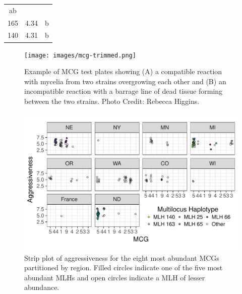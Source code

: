 \begin{longtable}[]{@{}cll@{}}
\begin{minipage}[t]{0.08\columnwidth}
ab\strut
\end{minipage}\tabularnewline
\begin{minipage}[t]{0.10\columnwidth}\centering\strut
165\strut
\end{minipage} & \begin{minipage}[t]{0.25\columnwidth}\raggedright\strut
4.34\strut
\end{minipage} & \begin{minipage}[t]{0.08\columnwidth}\raggedright\strut
b\strut
\end{minipage}\tabularnewline
\begin{minipage}[t]{0.10\columnwidth}\centering\strut
140\strut
\end{minipage} & \begin{minipage}[t]{0.25\columnwidth}\raggedright\strut
4.31\strut
\end{minipage} & \begin{minipage}[t]{0.08\columnwidth}\raggedright\strut
b\strut
\end{minipage}\tabularnewline
\bottomrule
\end{longtable}

\begin{figure}
\centering
\texttt{[image: images/mcg-trimmed.png]}
\caption{Example of MCG test plates showing (A) a compatible reaction
with mycelia from two strains overgrowing each other and (B) an
incompatible reaction with a barrage line of dead tissue forming between
the two strains. Photo Credit: Rebecca Higgins.}\label{mcg-fig}
\end{figure}

\begin{figure}
\centering
\includegraphics[width=1.00000\textwidth]{../../results/figures/publication/RMM-aggressiveness.pdf}
\caption{Strip plot of aggressiveness for the eight most abundant MCGs
partitioned by region. Filled circles indicate one of the five most
abundant MLHs and open circles indicate a MLH of lesser
abundance.}\label{mcg-mlh-region-aggressiveness}
\end{figure}

